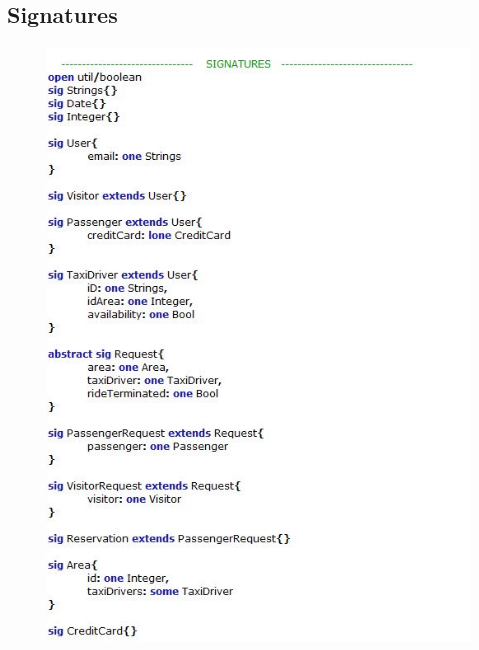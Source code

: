 \documentclass[18pt,oneside,a4paper, titlepage]{article}
\begin{document}
	\subsection{Signatures}
	\begin{figure}[h]
		\centering
		\includegraphics[scale=0.8]{Alloy/signatures.jpg}
	\end{figure}
\newpage
\end{document}
